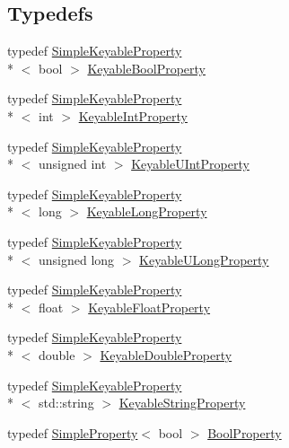 \subsection*{Typedefs}
\begin{DoxyCompactItemize}
\item 
typedef \hyperlink{classmaudio_1_1SimpleKeyableProperty}{Simple\-Keyable\-Property}\\*
$<$ bool $>$ \hyperlink{namespacemaudio_af68f7cbd0c3bf9f5129f9277e9f9a110}{Keyable\-Bool\-Property}
\item 
typedef \hyperlink{classmaudio_1_1SimpleKeyableProperty}{Simple\-Keyable\-Property}\\*
$<$ int $>$ \hyperlink{namespacemaudio_a8a917c57304d346d99654ef2ad50301e}{Keyable\-Int\-Property}
\item 
typedef \hyperlink{classmaudio_1_1SimpleKeyableProperty}{Simple\-Keyable\-Property}\\*
$<$ unsigned int $>$ \hyperlink{namespacemaudio_a203aa8c73c37bdb4da0e1636d470de5b}{Keyable\-U\-Int\-Property}
\item 
typedef \hyperlink{classmaudio_1_1SimpleKeyableProperty}{Simple\-Keyable\-Property}\\*
$<$ long $>$ \hyperlink{namespacemaudio_a9b05d4e46fdca4bf9572c77653abaab4}{Keyable\-Long\-Property}
\item 
typedef \hyperlink{classmaudio_1_1SimpleKeyableProperty}{Simple\-Keyable\-Property}\\*
$<$ unsigned long $>$ \hyperlink{namespacemaudio_a751b31106fc695d66e4e92c892238a8f}{Keyable\-U\-Long\-Property}
\item 
typedef \hyperlink{classmaudio_1_1SimpleKeyableProperty}{Simple\-Keyable\-Property}\\*
$<$ float $>$ \hyperlink{namespacemaudio_a55b4e79de26364f071a7f27c6266afd9}{Keyable\-Float\-Property}
\item 
typedef \hyperlink{classmaudio_1_1SimpleKeyableProperty}{Simple\-Keyable\-Property}\\*
$<$ double $>$ \hyperlink{namespacemaudio_a82d8d5304e29a8853cfdcec6702ea8c4}{Keyable\-Double\-Property}
\item 
typedef \hyperlink{classmaudio_1_1SimpleKeyableProperty}{Simple\-Keyable\-Property}\\*
$<$ std\-::string $>$ \hyperlink{namespacemaudio_a39666a5b0615d797ffb9206a4024f234}{Keyable\-String\-Property}
\item 
typedef \hyperlink{classmaudio_1_1SimpleProperty}{Simple\-Property}$<$ bool $>$ \hyperlink{namespacemaudio_a7765d14406acfae1163f970c3d1c09fa}{Bool\-Property}

\end{DoxyCompactItemize}
